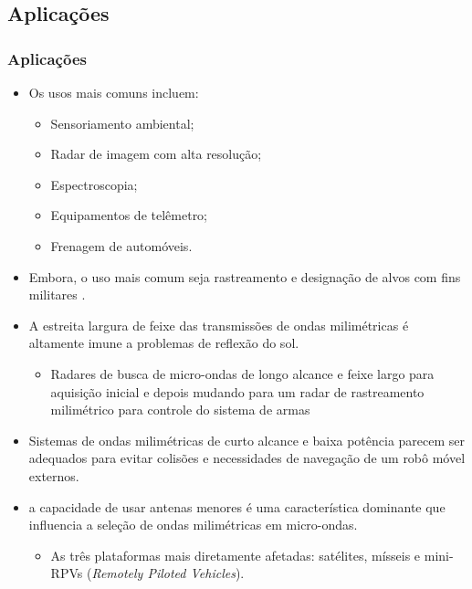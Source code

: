 \documentclass[xcolor=dvipsnames, aspectratio=169]{beamer}
\begin{document}
    \subsection[Introdução]{Aplicações} 
    \begin{frame}
    \frametitle{Aplicações}
        \begin{itemize}
            \item Os usos mais comuns incluem:
            \begin{itemize}
                \item Sensoriamento ambiental;
                \item Radar de imagem com alta resolução;
                \item Espectroscopia;
                \item Equipamentos de telêmetro;
                \item Frenagem de automóveis.
            \end{itemize}
            \item Embora, o uso mais comum seja rastreamento e designação de alvos com fins militares \cite{everett1995sensors}.
            \item A estreita largura de feixe das transmissões de ondas milimétricas é altamente
            imune a problemas de reflexão do sol.
            \begin{itemize}
                \item Radares de busca de micro-ondas de longo alcance
                e feixe largo para aquisição inicial e depois mudando para um radar de rastreamento
                milimétrico para controle do sistema de armas
            \end{itemize}
            \item Sistemas de ondas milimétricas de curto alcance e baixa potência parecem ser
            adequados para evitar colisões e necessidades de navegação de um robô móvel
            externos.
            \item a capacidade de usar antenas menores é uma característica
            dominante que influencia a seleção de ondas milimétricas em micro-ondas. 
            \begin{itemize}
                \item As três plataformas mais diretamente afetadas: satélites, mísseis e mini-RPVs (\textit{Remotely Piloted Vehicles}).
            \end{itemize}
        \end{itemize}
    \end{frame}
\end{document}
